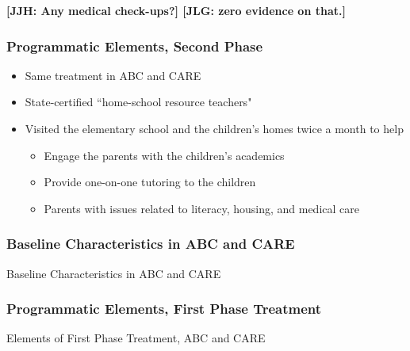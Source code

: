 \documentclass[static]{JJH-Beamer}
\begin{document}
\textbf{[JJH: Any medical check-ups?] [JLG: zero evidence on that.]}
\clearpage
\begin{frame}
 \addtocounter{framenumber}{-1}
\frametitle{Programmatic Elements, Second Phase}\label{elements}

\begin{itemize}	
\item Same treatment in ABC and CARE
\item State-certified ``home-school resource teachers"
\item Visited the elementary school and the children's homes twice a month to help
	\begin{itemize}
	\item Engage the parents with the children's academics
	\item Provide one-on-one tutoring to the children
	\item Parents with issues related to literacy, housing, and medical care
	\end{itemize}
\end{itemize}

\end{frame}

\begin{frame}
 \addtocounter{framenumber}{-1}
\frametitle{Baseline Characteristics in ABC and CARE}\label{baseline_abccare}

\begin{table}[H]
\caption{Baseline Characteristics in ABC and CARE}
\begin{center}
\end{center}
\end{table}

\end{frame}

\begin{frame}
 \addtocounter{framenumber}{-1}
\frametitle{Programmatic Elements, First Phase Treatment}\label{first_phase}
	
\begin{table}[H]
\caption{Elements of First Phase Treatment, ABC and CARE}
\begin{center}
\end{center}
\end{table}

\end{frame}
\end{document}
